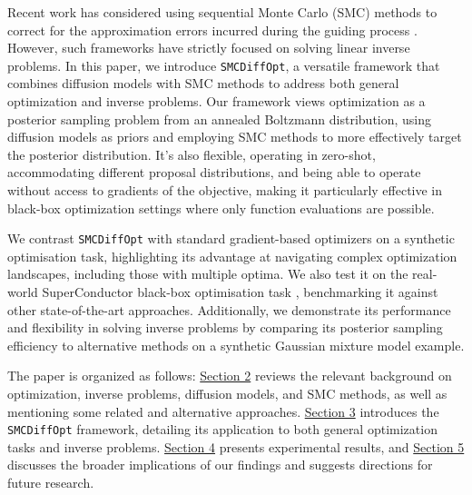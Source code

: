 Recent work has considered using sequential Monte Carlo (SMC) methods
\parencite{chopinIntroductionSequentialMonte2020} to correct for the approximation errors incurred
during the guiding process
\parencite{trippeDiffusionProbabilisticModeling2023,cardosoMonteCarloGuided2023,douDiffusionPosteriorSampling2023,wuPracticalAsymptoticallyExact2023}.
However, such frameworks have strictly focused on solving linear inverse problems.
In this paper, we introduce \texttt{SMCDiffOpt}, a versatile framework that combines diffusion models
with SMC methods to address both general optimization and inverse problems. Our framework views
optimization as a posterior sampling problem from an annealed Boltzmann distribution, using
diffusion models as priors and employing SMC methods to more effectively target the posterior
distribution. It's also flexible, operating in zero-shot, accommodating different proposal
distributions, and being able to operate without access to gradients of the objective, making it
particularly effective in black-box optimization settings where only function evaluations are
possible.

We contrast \texttt{SMCDiffOpt} with standard gradient-based optimizers on a synthetic optimisation
task, highlighting its advantage at navigating complex optimization landscapes, including those
with multiple optima. We also test it on the real-world SuperConductor black-box optimisation task
\parencite{trabuccoDesignBenchBenchmarksDataDriven2022}, benchmarking it against other
state-of-the-art approaches. Additionally, we demonstrate its performance and flexibility in solving
inverse problems by comparing its posterior sampling efficiency to alternative methods on a
synthetic Gaussian mixture model example.

The paper is organized as follows: \hyperref[chap:background]{Section 2} reviews the relevant
background on optimization, inverse problems, diffusion models, and SMC methods, as well as
mentioning some related and alternative approaches. \hyperref[chap:methods]{Section 3} introduces
the \texttt{SMCDiffOpt} framework, detailing its application to both general optimization tasks and
inverse problems.  \hyperref[chap:experiments]{Section 4} presents experimental results, and
\hyperref[chap:discussion]{Section 5} discusses the broader implications of our findings and
suggests directions for future research.
